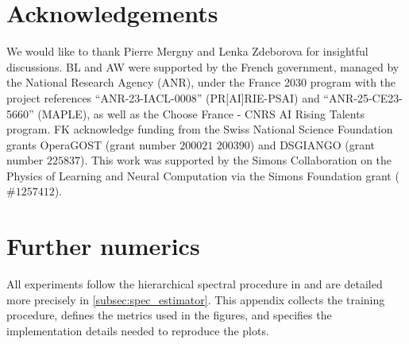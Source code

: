 \documentclass[]{article}
\numberwithin{equation}{section}
\theoremstyle{definition}
\begin{document}
\section*{Acknowledgements}
We would like to thank Pierre Mergny and Lenka Zdeborova for insightful discussions. BL and AW were supported by the French government, managed by the National Research Agency (ANR), under the France 2030 program with the project references ``ANR-23-IACL-0008'' (PR[AI]RIE-PSAI) and ``ANR-25-CE23-5660'' (MAPLE), as well as the Choose France - CNRS AI Rising Talents program. FK acknowledge funding from the Swiss National Science Foundation grants OperaGOST (grant number $200021$ $200390$) and DSGIANGO (grant number $225837$). This work was supported by the Simons Collaboration on the Physics of Learning and Neural Computation via the Simons Foundation grant ($\#1257412$).





\newpage
\appendix
\section{Further numerics}\label{app:numerics2}

All experiments follow the hierarchical spectral procedure in  and are detailed more precisely in \ref{subsec:spec_estimator}. This appendix collects the training procedure, defines the metrics used in the figures, and specifies the implementation details needed to reproduce the plots.
\end{document}

